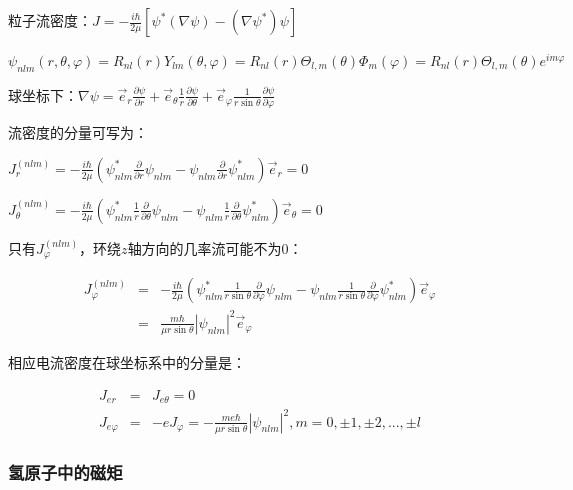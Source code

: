 粒子流密度：$J =  - \frac{{i\hbar }}{{2\mu }}\left[ {\psi ^* \left( {\nabla \psi } \right) - \left( {\nabla \psi ^* } \right)\psi } \right]$

$\psi _{nlm} \left( {r,\theta ,\varphi } \right) = R_{nl} \left( r \right)Y_{lm} \left( {\theta ,\varphi } \right) = R_{nl} \left( r \right)\Theta _{l,m} \left( \theta  \right)\Phi _m \left( \varphi  \right) = R_{nl} \left( r \right)\Theta _{l,m} \left( \theta  \right)e^{im\varphi } $

球坐标下：$\nabla \psi  = \vec e_r \frac{{\partial \psi }}{{\partial r}} + \vec e_\theta  \frac{1}{r}\frac{{\partial \psi }}{{\partial \theta }} + \vec e_\varphi  \frac{1}{{r\sin \theta }}\frac{{\partial \psi }}{{\partial \varphi }}$

流密度的分量可写为：

$J_r^{(nlm)}  =  - \frac{{i\hbar }}{{2\mu }}\left( {\psi _{nlm}^* \frac{\partial }{{\partial r}}\psi _{nlm}  - \psi _{nlm} \frac{\partial }{{\partial r}}\psi _{nlm}^* } \right)\vec e_r  = 0$

$J_\theta ^{(nlm)}  =  - \frac{{i\hbar }}{{2\mu }}\left( {\psi _{nlm}^* \frac{1}{r}\frac{\partial }{{\partial \theta }}\psi _{nlm}  - \psi _{nlm} \frac{1}{r}\frac{\partial }{{\partial \theta }}\psi _{nlm}^* } \right)\vec e_\theta   = 0$

只有$J_\varphi ^{(nlm)}$，环绕$z$轴方向的几率流可能不为0：

\begin{eqnarray*}
J_\varphi ^{(nlm)}  & = &  - \frac{{i\hbar }}{{2\mu }}\left( {\psi _{nlm}^* \frac{1}{{r\sin \theta }}\frac{\partial }{{\partial \varphi }}\psi _{nlm}  - \psi _{nlm} \frac{1}{{r\sin \theta }}\frac{\partial }{{\partial \varphi }}\psi _{nlm}^* } \right)\vec e_\varphi   \\
{} & = & \frac{{m\hbar }}{{\mu r\sin \theta }}\left| {\psi _{nlm} } \right|^2 \vec e_\varphi
\end{eqnarray*}

相应电流密度在球坐标系中的分量是：

\begin{eqnarray*}
J_{er} & = & J_{e\theta }  = 0 \\
J_{e\varphi } & = &  - eJ_\varphi   =  - \frac{{me\hbar }}{{\mu r\sin \theta }}\left| {\psi _{nlm} } \right|^2 , m = 0, \pm 1, \pm 2,..., \pm l
\end{eqnarray*}

\subsubsection{氢原子中的磁矩}

